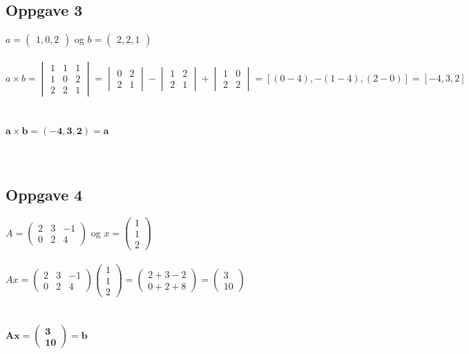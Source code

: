 \documentclass{article}
\newcommand{\vect}[1]{\begin{pmatrix} #1 \end{pmatrix}}
\begin{document}
\subsection*{Oppgave 3}
\(a = \vect{1, 0, 2}\) og \(b = \vect{2, 2, 1}\)
\\\\
\(a \times b = \begin{vmatrix}
    1&1&1\\
    1&0&2\\
    2&2&1
\end{vmatrix} = \begin{vmatrix}
    0&2\\2&1
\end{vmatrix} - \begin{vmatrix}
    1&2\\2&1
\end{vmatrix} + \begin{vmatrix}
    1&0\\2&2
\end{vmatrix} = [(0-4), -(1-4), (2-0)] = [-4, 3, 2]\)
\\\\\\
\(\mathbf{a\times b = (-4, 3, 2) = a}\)
\\\\\

\newpage
\subsection*{Oppgave 4}
\(A = \vect{2&3&-1\\0&2&4}\) og \(x = \vect{1\\1\\2}\)
\\\\
\(Ax = \vect{2&3&-1 \\ 0&2&4}\vect{1\\1\\2} = \begin{pmatrix}
    2+3-2 \\ 0+2+8
\end{pmatrix} = \begin{pmatrix}
    3 \\ 10
\end{pmatrix}\)
\\\\\\
\(\mathbf{Ax = \vect{3 \\ 10} = b}\)
\\\\\\
\end{document}

